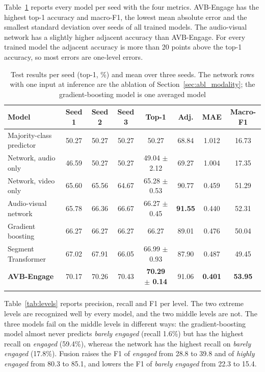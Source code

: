 \documentclass[pdflatex,iicol,sn-basic]{sn-jnl}
\newcommand{\ournet}{AVB-Engage}
\begin{document}
Table~\ref{tab:seeds} reports every model per seed with the four metrics. \ournet{} has the highest top-1 accuracy and macro-F1, the lowest mean absolute error and the smallest standard deviation over seeds of all trained models. The audio-visual network has a slightly higher adjacent accuracy than \ournet. For every trained model the adjacent accuracy is more than 20 points above the top-1 accuracy, so most errors are one-level errors.

\begin{table}[t]
\caption{Test results per seed (top-1, \%) and mean over three seeds. The network rows with one input at inference are the ablation of Section~\ref{sec:abl_modality}; the gradient-boosting model is one averaged model}\label{tab:seeds}
\begin{tabular*}{\textwidth}{@{\extracolsep\fill}lccccccc}
\toprule
Model & Seed 1 & Seed 2 & Seed 3 & Top-1 & Adj. & MAE & Macro-F1\\
\midrule
Majority-class predictor & 50.27 & 50.27 & 50.27 & 50.27 & 68.84 & 1.012 & 16.73\\
Network, audio only & 46.59 & 50.27 & 50.27 & 49.04 $\pm$ 2.12 & 69.27 & 1.004 & 17.35\\
Network, video only & 65.60 & 65.56 & 64.67 & 65.28 $\pm$ 0.53 & 90.77 & 0.459 & 51.29\\
Audio-visual network & 65.78 & 66.36 & 66.67 & 66.27 $\pm$ 0.45 & \textbf{91.55} & 0.440 & 52.31\\
Gradient boosting & 66.27 & 66.27 & 66.27 & 66.27 & 89.01 & 0.476 & 50.04\\
Segment Transformer & 67.02 & 67.91 & 66.05 & 66.99 $\pm$ 0.93 & 87.90 & 0.487 & 49.45\\
\textbf{\ournet} & 70.17 & 70.26 & 70.43 & \textbf{70.29 $\pm$ 0.14} & 91.06 & \textbf{0.401} & \textbf{53.95}\\
\botrule
\end{tabular*}
\end{table}

Table~\ref{tab:levels} reports precision, recall and F1 per level. The two extreme levels are recognized well by every model, and the two middle levels are not. The three models fail on the middle levels in different ways: the gradient-boosting model almost never predicts \emph{barely engaged} (recall 1.6\%) but has the highest recall on \emph{engaged} (59.4\%), whereas the network has the highest recall on \emph{barely engaged} (17.8\%). Fusion raises the F1 of \emph{engaged} from 28.8 to 39.8 and of \emph{highly engaged} from 80.3 to 85.1, and lowers the F1 of \emph{barely engaged} from 22.3 to 15.4.
\end{document}

